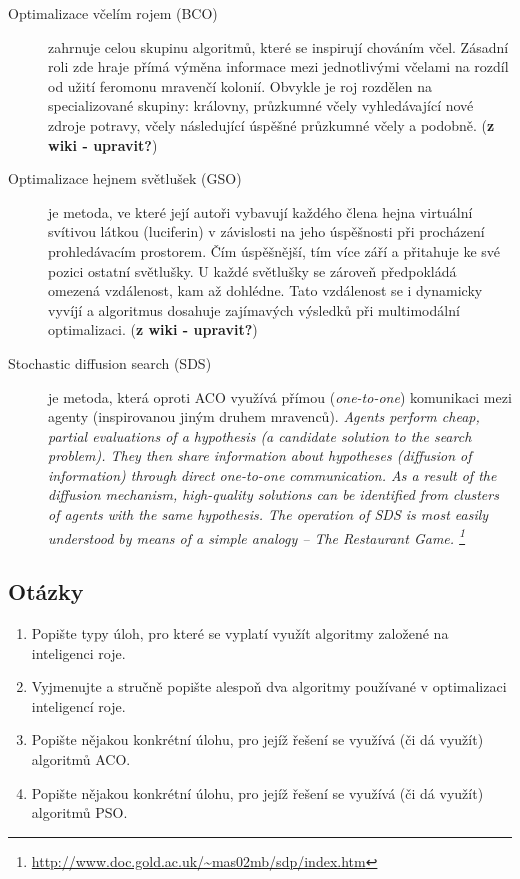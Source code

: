 \documentclass[a4paper,12pt]{article}
\begin{document}
\begin{description} %

\item[Optimalizace včelím rojem (BCO)] zahrnuje celou skupinu algoritmů, které se inspirují chováním včel.
Zásadní roli zde hraje přímá výměna informace mezi jednotlivými včelami na rozdíl od užití feromonu mravenčí
kolonií. Obvykle je roj rozdělen na specializované skupiny: královny, průzkumné včely vyhledávající nové zdroje
potravy, včely následující úspěšné průzkumné včely a podobně. ({\bf z wiki - upravit?})

\item[Optimalizace hejnem světlušek (GSO)] je metoda, ve které její autoři vybavují  každého člena hejna
virtuální svítivou látkou (luciferin) v závislosti na jeho úspěšnosti při procházení prohledávacím prostorem.
Čím úspěšnější, tím více září a přitahuje ke své pozici ostatní světlušky. U každé světlušky se zároveň
předpokládá omezená vzdálenost, kam až dohlédne. Tato vzdálenost se i dynamicky vyvíjí a algoritmus dosahuje
zajímavých výsledků při multimodální optimalizaci. ({\bf z wiki - upravit?})

\item[Stochastic diffusion search (SDS)] je metoda, která oproti ACO využívá přímou ({\it one-to-one}) komunikaci
mezi agenty (inspirovanou jiným druhem mravenců). {\it Agents perform cheap, partial evaluations of a hypothesis (a candidate solution to the search problem). They then share information about hypotheses (diffusion of information) through direct one-to-one communication. As a result of the diffusion mechanism, high-quality solutions can be identified from clusters of agents with the same hypothesis. The operation of SDS is most easily understood by means of a simple analogy – The Restaurant Game. \footnote{\url{http://www.doc.gold.ac.uk/~mas02mb/sdp/index.htm}}}


\end{description}


\subsection{Otázky}
\begin{enumerate}
  \item Popište typy úloh, pro které se vyplatí využít algoritmy založené na inteligenci roje.
  \item Vyjmenujte a stručně popište alespoň dva algoritmy používané v optimalizaci inteligencí roje.
  \item Popište nějakou konkrétní úlohu, pro jejíž řešení se využívá (či dá využít) algoritmů ACO.
  \item Popište nějakou konkrétní úlohu, pro jejíž řešení se využívá (či dá využít) algoritmů PSO.
\end{enumerate}
\end{document}
